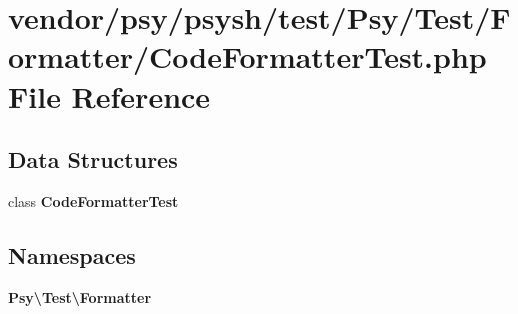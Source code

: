 \section{vendor/psy/psysh/test/\+Psy/\+Test/\+Formatter/\+Code\+Formatter\+Test.php File Reference}
\label{_code_formatter_test_8php}
\subsection*{Data Structures}
\begin{DoxyCompactItemize}
\item 
class {\bf Code\+Formatter\+Test}
\end{DoxyCompactItemize}
\subsection*{Namespaces}
\begin{DoxyCompactItemize}
\item 
 {\bf Psy\textbackslash{}\+Test\textbackslash{}\+Formatter}
\end{DoxyCompactItemize}
